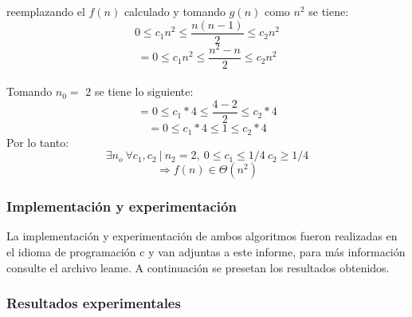 \documentclass[11pt]{article}
\begin{document}
reemplazando el \(f(n)\) calculado y tomando \(g(n)\) como \(n^2\) se tiene:
\[0 \leq  c_1 n^2 \leq \frac{n(n-1)}{2} \leq c_2 n^2\]
\[= 0 \leq  c_1 n^2 \leq \frac{n^2-n}{2} \leq c_2 n^2\]\\

Tomando \(n_0 = \) 2 se tiene lo siguiente:
\[= 0 \leq  c_1 * 4 \leq \frac{4-2}{2} \leq c_2 * 4\]
\[= 0 \leq  c_1 * 4 \leq 1 \leq c_2 * 4\]
Por lo tanto:
\[ \exists n_o\  \forall c_1,c_2 \ | \ n_2 = 2,\ 0 \leq c_1 \leq 1/4 \ c_2 \geq 1/4 \]
\[\Rightarrow f(n) \in \Theta(n^2)\]
\subsubsection{Implementación y experimentación}
La implementación y experimentación de ambos algoritmos fueron realizadas en el idioma de programación c y van adjuntas a este informe, para más información consulte el archivo leame. A continuación se presetan los resultados obtenidos.
\subsubsection{Resultados experimentales}
 
\end{document}
